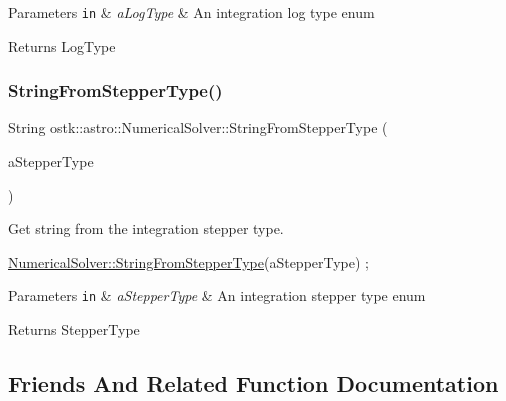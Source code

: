\begin{DoxyParams}[1]{Parameters}
\mbox{\tt in}  & {\em a\+Log\+Type} & An integration log type enum \\
\hline
\end{DoxyParams}
\begin{DoxyReturn}{Returns}
Log\+Type 
\end{DoxyReturn}
\mbox{\label{classostk_1_1astro_1_1_numerical_solver_a3dd4e9b6acffec931c3748d4d851155b}} 
\subsubsection{\texorpdfstring{String\+From\+Stepper\+Type()}{StringFromStepperType()}}
{\footnotesize\ttfamily String ostk\+::astro\+::\+Numerical\+Solver\+::\+String\+From\+Stepper\+Type (\begin{DoxyParamCaption}\item[{const \hyperlink{classostk_1_1astro_1_1_numerical_solver_afb80f81b2c3cc1d356b0b4749e45b947}{Numerical\+Solver\+::\+Stepper\+Type} \&}]{a\+Stepper\+Type }\end{DoxyParamCaption})\hspace{0.3cm}{\ttfamily [static]}}



Get string from the integration stepper type. 


\begin{DoxyCode}
\hyperlink{classostk_1_1astro_1_1_numerical_solver_a3dd4e9b6acffec931c3748d4d851155b}{NumericalSolver::StringFromStepperType}(aStepperType) ;
\end{DoxyCode}
 
\begin{DoxyParams}[1]{Parameters}
\mbox{\tt in}  & {\em a\+Stepper\+Type} & An integration stepper type enum \\
\hline
\end{DoxyParams}
\begin{DoxyReturn}{Returns}
Stepper\+Type 
\end{DoxyReturn}


\subsection{Friends And Related Function Documentation}
\mbox{\label{classostk_1_1astro_1_1_numerical_solver_a28e4d7a66856d0bedb035589eb5e70f7}} 
